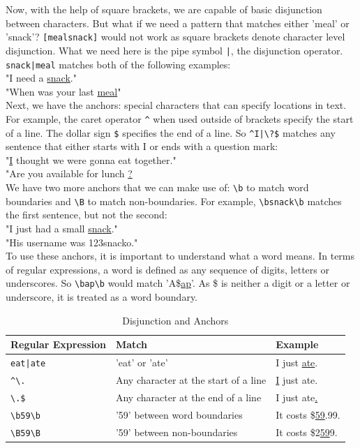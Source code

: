 Now, with the help of square brackets, we are capable of basic disjunction between characters. 
But what if we need a pattern that matches either 'meal' or 'snack'?
\texttt{[mealsnack]} would not work as square brackets denote character level disjunction. 
What we need here is the pipe symbol \texttt{|}, the disjunction operator.
\texttt{snack|meal} matches both of the following examples:\\
"I need a \underline{snack}."\\
"When was your last \underline{meal}"\\
Next, we have the anchors: special characters that can specify locations in text.
For example, the caret operator \texttt{\^{}} when used outside of brackets specify the start of a line.
The dollar sign \texttt{\$} specifies the end of a line.
So \texttt{\^{}I|\textbackslash?\$} matches any sentence that either starts with I or ends with a question mark:\\
"\underline{I} thought we were gonna eat together."\\
"Are you available for lunch \underline{?}\\
We have two more anchors that we can make use of:
\texttt{\textbackslash b} to match word boundaries and \texttt{\textbackslash B} to match non-boundaries.
For example, \texttt{\textbackslash bsnack\textbackslash b} matches the first sentence, but not the second:\\
"I just had a small \underline{snack}."\\
"His username was 123snacko."\\
To use these anchors, it is important to understand what a word means.
In terms of regular expressions, a word is defined as any sequence of digits, letters or underscores.
So \texttt{\textbackslash bap\textbackslash b} would match 'A\$\underline{ap}'.
As \$ is neither a digit or a letter or underscore, it is treated as a word boundary.

\begin{table}[htbp]
  \caption[Regular Expression Disjunction and Anchors]{Disjunction and Anchors}\label{tab:re_da}		
  \centering
  \begin{tabular}{l l l}
    Regular Expression&Match&Example\\ \toprule
    \texttt{eat|ate}&'eat' or 'ate'&I just \underline{ate}.\\ \hline
    \texttt{\^{}\textbackslash .}&Any character at the start of a line&\underline{I} just ate.\\ \hline
    \texttt{\textbackslash .\$}&Any character at the end of a line&I just ate\underline{.}\\ \hline
    \texttt{\textbackslash b59\textbackslash b}&'59' between word boundaries&It costs \$\underline{59}.99.\\ \hline
    \texttt{\textbackslash B59\textbackslash B}&'59' between non-boundaries&It costs \$2\underline{59}9.\\ \hline
  \end{tabular}
\end{table}

